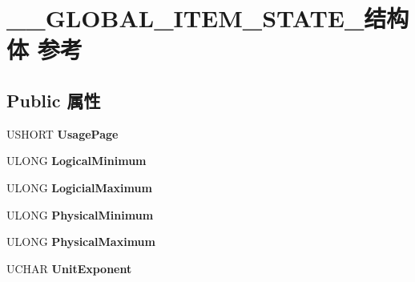 \hypertarget{struct_____g_l_o_b_a_l___i_t_e_m___s_t_a_t_e__}{}\section{\+\_\+\+\_\+\+G\+L\+O\+B\+A\+L\+\_\+\+I\+T\+E\+M\+\_\+\+S\+T\+A\+T\+E\+\_\+结构体 参考}
\label{struct_____g_l_o_b_a_l___i_t_e_m___s_t_a_t_e__}
\subsection*{Public 属性}
\begin{DoxyCompactItemize}
\item 
\mbox{\label{struct_____g_l_o_b_a_l___i_t_e_m___s_t_a_t_e___a010ea89b7c2e5a411b20691816cbcbc0}} 
U\+S\+H\+O\+RT {\bfseries Usage\+Page}
\item 
\mbox{\label{struct_____g_l_o_b_a_l___i_t_e_m___s_t_a_t_e___acbcbdabaa56c7c70067a8ffd29c7db52}} 
U\+L\+O\+NG {\bfseries Logical\+Minimum}
\item 
\mbox{\label{struct_____g_l_o_b_a_l___i_t_e_m___s_t_a_t_e___a6e66787f06ce13d5ba60eda82752aa23}} 
U\+L\+O\+NG {\bfseries Logicial\+Maximum}
\item 
\mbox{\label{struct_____g_l_o_b_a_l___i_t_e_m___s_t_a_t_e___ad716c968f64e5173eb8b3a184cc92aa2}} 
U\+L\+O\+NG {\bfseries Physical\+Minimum}
\item 
\mbox{\label{struct_____g_l_o_b_a_l___i_t_e_m___s_t_a_t_e___adfa50da2b8fda33399b5dadaef733663}} 
U\+L\+O\+NG {\bfseries Physical\+Maximum}
\item 
\mbox{\label{struct_____g_l_o_b_a_l___i_t_e_m___s_t_a_t_e___a6b6f4fd324f9f0cdbf28eb3f7e9b3090}} 
U\+C\+H\+AR {\bfseries Unit\+Exponent}
\item 
\mbox{\label{struct_____g_l_o_b_a_l___i_t_e_m___s_t_a_t_e___a8e3b555a76886fc19a029a85f287a581}} 

\end{DoxyCompactItemize}
